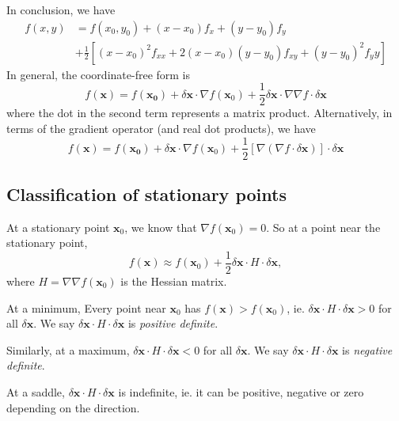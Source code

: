 \documentclass[a4paper]{article}
\begin{document}
In conclusion, we have
\begin{align*}
  f(x, y) &= f(x_0, y_0) + (x - x_0)f_x + (y - y_0)f_y \\
  &+ \frac{1}{2}[(x - x_0)^2 f_{xx} + 2(x - x_0)(y - y_0)f_{xy} + (y - y_0)^2 f_yy]
\end{align*}
In general, the coordinate-free form is
\[
  f(\mathbf{x}) = f(\mathbf{x_0}) + \delta \mathbf{x}\cdot\nabla f(\mathbf{x}_0) + \frac{1}{2}\delta \mathbf{x}\cdot \nabla \nabla f\cdot \delta \mathbf{x}
\]
where the dot in the second term represents a matrix product. Alternatively, in terms of the gradient operator (and real dot products), we have
\[
  f(\mathbf{x}) = f(\mathbf{x_0}) + \delta \mathbf{x}\cdot \nabla f(\mathbf{x}_0) + \frac{1}{2}[\nabla (\nabla f\cdot \delta \mathbf{x})]\cdot \delta\mathbf{x}
\]

\subsection{Classification of stationary points}
At a stationary point $\mathbf{x}_0$, we know that $\nabla f(\mathbf{x}_0) = 0$. So at a point near the stationary point,
\[
  f(\mathbf{x})\approx f(\mathbf{x}_0) + \frac{1}{2}\delta\mathbf{x}\cdot H\cdot \delta\mathbf{x},
\]
where $H = \nabla\nabla f(\mathbf{x}_0)$  is the Hessian matrix.

At a minimum, Every point near $\mathbf{x}_0$ has $f(\mathbf{x}) > f(\mathbf{x}_0)$, ie. $\delta \mathbf{x}\cdot H\cdot \delta \mathbf{x} > 0$ for all $\delta \mathbf{x}$. We say $\delta \mathbf{x}\cdot H\cdot\delta \mathbf{x}$ is \emph{positive definite}.

Similarly, at a maximum, $\delta \mathbf{x}\cdot H\cdot \delta\mathbf{x} < 0$ for all $\delta \mathbf{x}$. We say $\delta \mathbf{x}\cdot H\cdot \delta \mathbf{x}$ is \emph{negative definite}.

At a saddle, $\delta \mathbf{x} \cdot H\cdot \delta\mathbf{x}$ is indefinite, ie. it can be positive, negative or zero depending on the direction.
\end{document}
